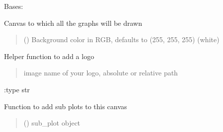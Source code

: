 \documentclass[letterpaper,10pt,english]{sphinxmanual}
\begin{document}
\begin{fulllineitems}
\label{\detokenize{index:sjvisualizer.Canvas.canvas}}
\pysigstartsignatures
{}
\pysigstopsignatures
\sphinxAtStartPar
Bases: 

\sphinxAtStartPar
Canvas to which all the graphs will be drawn
\begin{quote}\begin{description}
\sphinxAtStartPar
{} () \textendash{} Background color in RGB, defaults to (255, 255, 255) (white)

\end{description}\end{quote}

\begin{fulllineitems}
\label{\detokenize{index:sjvisualizer.Canvas.canvas.add_logo}}
\pysigstartsignatures
{}
\pysigstopsignatures
\sphinxAtStartPar
Helper function to add a logo
\begin{quote}\begin{description}
\sphinxAtStartPar
{} \textendash{} image name of your logo, absolute or relative path

\end{description}\end{quote}

\sphinxAtStartPar
:type str

\end{fulllineitems}


\begin{fulllineitems}
\label{\detokenize{index:sjvisualizer.Canvas.canvas.add_sub_plot}}
\pysigstartsignatures
{}
\pysigstopsignatures
\sphinxAtStartPar
Function to add sub plots to this canvas
\begin{quote}\begin{description}
\sphinxAtStartPar
{} () \textendash{} sub\_plot object


\end{description}
\end{quote}
\end{fulllineitems}
\end{fulllineitems}
\end{document}
